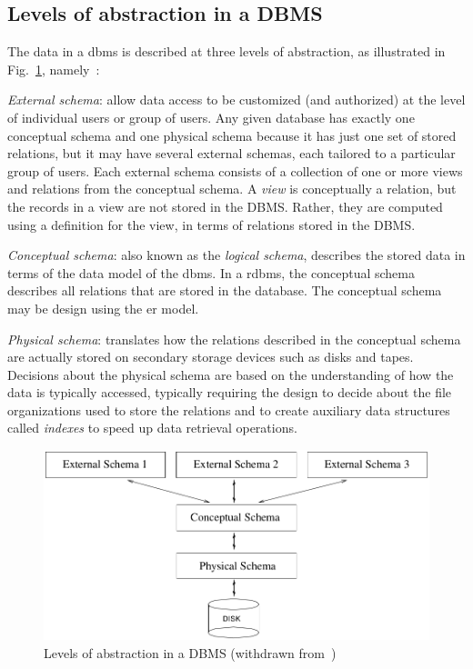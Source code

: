 \subsection{Levels of abstraction in a DBMS}
\label{sec:levels-abstr-dbms}
The data in a \gls{dbms} is described at three levels of abstraction, as
illustrated in Fig.~\ref{fig:dbms-abstraction-levels},
namely~\cite{ramakrishnan2003database}:
\begin{item-c}
\item \emph{External schema}: allow data access to be customized (and
  authorized) at the level of individual users or group of users.
  Any given database has exactly one conceptual schema and one
physical schema because it has just one set of stored relations, but it may have
several external schemas, each tailored to a particular group of users.
Each external schema consists of a collection of one or more views and relations
from the conceptual schema.
A \emph{view} is conceptually a relation, but the records in a view are not
stored in the DBMS. Rather, they are computed using a definition for the view,
in terms of relations stored in the DBMS.
\item \emph{Conceptual schema}: also known as the \emph{logical schema},
  describes the stored data in terms of the data model of the \gls{dbms}. In a
  \gls{rdbms}, the conceptual schema describes all relations that are stored in
  the database. The conceptual schema may be design using the \gls{er} model.
\item \emph{Physical schema}: translates how the relations described in the
  conceptual schema are actually stored on secondary storage devices such as
  disks and tapes. Decisions about the physical schema are based on the
  understanding of how the data is typically accessed, typically requiring the
  design to decide about the file organizations used to store the relations and
  to create auxiliary data structures called \emph{indexes} to speed up data
  retrieval operations.
\end{item-c}
%
\begin{figure}[htb!]
\centering
    \includegraphics[width=0.65\columnwidth]{./img/dbms-abstraction-levels.png}
  \caption{Levels of abstraction in a DBMS (withdrawn from~\cite{ramakrishnan2003database})}%
\label{fig:dbms-abstraction-levels}
\end{figure}
%
